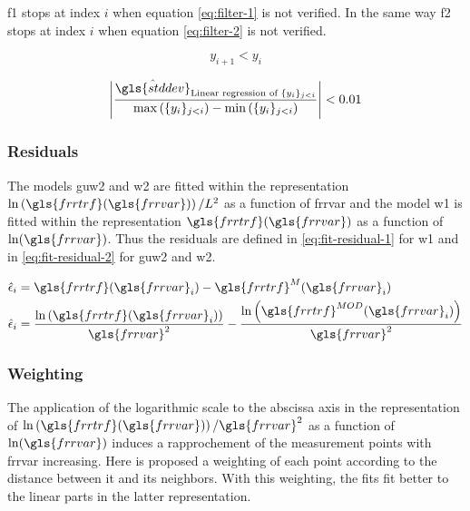 %
%

\bigskip

\gls{f1} stops at index \( i \) when equation \eqref{eq:filter-1} is not verified.
In the same way \gls{f2} stops at index \( i \) when equation \eqref{eq:filter-2} is not verified.

\begin{equation}\label{eq:filter-1}
y_{i+1} < y_i
\end{equation}

\begin{equation}\label{eq:filter-2}
\left| \frac{\hat{\gls{stddev}}_{\text{Linear regression of } \{ y_i \}_{j<i}}}{\max \left( \{ y_i \}_{j<i} \right) - \min \left( \{ y_i \}_{j<i} \right)} \right| < 0.01
\end{equation}

\subsubsection{Residuals}

The models \gls{guw2} and \gls{w2} are fitted within the representation \( \ln \left( \gls{frrtrf}(\gls{frrvar}) \right)/L^2 \) as a function of \gls{frrvar} and the model \gls{w1} is fitted within the representation \( \gls{frrtrf}(\gls{frrvar}) \) as a function of \( \ln(\gls{frrvar}) \). Thus the residuals are defined in \eqref{eq:fit-residual-1} for \gls{w1} and in \eqref{eq:fit-residual-2} for \gls{guw2} and \gls{w2}.

\begin{align}
\hat{\epsilon}_i &=
\gls{frrtrf}(\gls{frrvar}_i) - \gls{frrtrf}^{M}(\gls{frrvar}_i) \label{eq:fit-residual-1} \\
\hat{\epsilon}_i &=
\frac{\ln\left(\gls{frrtrf}(\gls{frrvar}_i)\right)}{\gls{frrvar}^2} -
\frac{\ln\left(\gls{frrtrf}^{MOD}(\gls{frrvar}_i)\right)}{\gls{frrvar}^2} \label{eq:fit-residual-2}
\end{align}

\subsubsection{Weighting}
The application of the logarithmic scale to the abscissa axis in the representation of \( \ln \left( \gls{frrtrf}(\gls{frrvar}) \right) / \gls{frrvar}^2 \) as a function of \( \ln(\gls{frrvar}) \) induces a rapprochement of the measurement points with \gls{frrvar} increasing.
Here is proposed a weighting of each point according to the distance between it and its neighbors.
With this weighting, the fits fit better to the linear parts in the latter representation.

